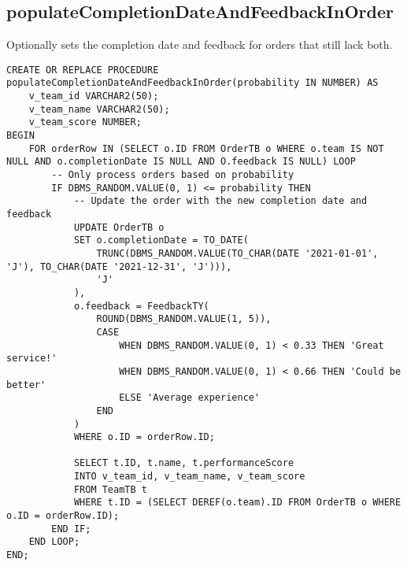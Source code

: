 \subsection*{populateCompletionDateAndFeedbackInOrder}
Optionally sets the completion date and feedback for orders that still lack both.
\begin{lstlisting}
CREATE OR REPLACE PROCEDURE populateCompletionDateAndFeedbackInOrder(probability IN NUMBER) AS
    v_team_id VARCHAR2(50);
    v_team_name VARCHAR2(50);
    v_team_score NUMBER;
BEGIN
    FOR orderRow IN (SELECT o.ID FROM OrderTB o WHERE o.team IS NOT NULL AND o.completionDate IS NULL AND O.feedback IS NULL) LOOP
        -- Only process orders based on probability
        IF DBMS_RANDOM.VALUE(0, 1) <= probability THEN
            -- Update the order with the new completion date and feedback
            UPDATE OrderTB o
            SET o.completionDate = TO_DATE(
                TRUNC(DBMS_RANDOM.VALUE(TO_CHAR(DATE '2021-01-01', 'J'), TO_CHAR(DATE '2021-12-31', 'J'))),
                'J'
            ),
            o.feedback = FeedbackTY(
                ROUND(DBMS_RANDOM.VALUE(1, 5)),
                CASE
                    WHEN DBMS_RANDOM.VALUE(0, 1) < 0.33 THEN 'Great service!'
                    WHEN DBMS_RANDOM.VALUE(0, 1) < 0.66 THEN 'Could be better'
                    ELSE 'Average experience'
                END
            )
            WHERE o.ID = orderRow.ID;

            SELECT t.ID, t.name, t.performanceScore
            INTO v_team_id, v_team_name, v_team_score
            FROM TeamTB t
            WHERE t.ID = (SELECT DEREF(o.team).ID FROM OrderTB o WHERE o.ID = orderRow.ID);
        END IF;
    END LOOP;
END;
\end{lstlisting}